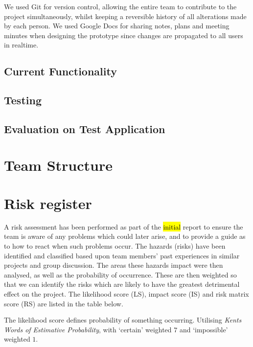 \documentclass[10pt,a4paper]{article}
\begin{document}
We used Git for version control, allowing the entire team to contribute to the project simultaneously, whilst keeping a reversible history of all alterations made by each person. We used Google Docs for sharing notes, plans and meeting minutes when designing the prototype since changes are propagated to all users in realtime.

\subsection{Current Functionality}

\subsection{Testing}

\subsection{Evaluation on Test Application}

\section{Team Structure}

\section{Risk register}
A risk assessment has been performed as part of the \hl{initial} report to ensure the team is aware of any problems which could later arise, and to provide a guide as to how to react when such problems occur. The hazards (risks) have been identified and classified based upon team members' past experiences in similar projects and group discussion. The areas these hazards impact were then analysed, as well as the probability of occurrence. These are then weighted so that we can identify the risks which are likely to have the greatest detrimental effect on the project. The likelihood score (LS), impact score (IS) and risk matrix score (RS) are listed in the table below.



The likelihood score defines probability of something occurring. Utilising
\textit{Kents Words of Estimative Probability}\cite{kent1966strategic}, with
`certain' weighted $7$ and `impossible' weighted $1$.



\end{document}
